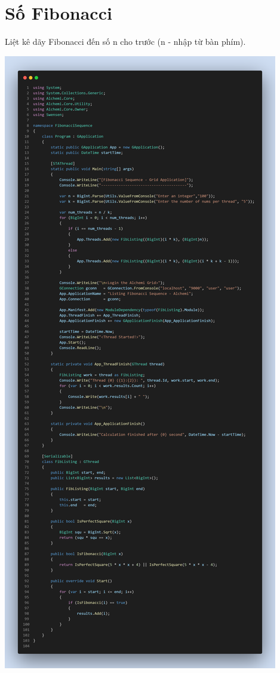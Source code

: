 \documentclass[12pt,a4paper]{report}
\begin{document}
\chapter{Số Fibonacci}

\begin{tcolorbox}[title=Đề bài, colback=red!5!white, colframe=red!70!black]
Liệt kê dãy Fibonacci đến số n cho trước (n - nhập từ bàn phím).
\end{tcolorbox}

\begin{center}
\includegraphics[trim=0in 35.1in 0in 0in, clip, scale=.23]{./Figures/FibonacciSequence/FibonacciSequence}

\end{center}
\end{document}
